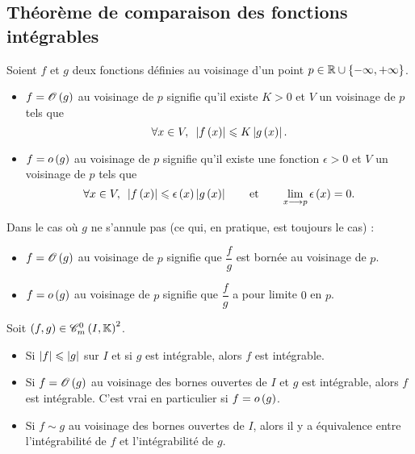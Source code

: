 \subsection{Théorème de comparaison des fonctions intégrables}

\begin{rappel}
Soient \(f\) et \(g\) deux fonctions définies au voisinage d'un point \(p\in\mathbb{R}\cup\left\lbrace-\infty,+\infty\right\rbrace\).

\begin{itemize}
    \item \(f=\mathscr{O}\left(g\right)\) au voisinage de \(p\) signifie qu'il existe \(K>0\) et \(V\) un voisinage de \(p\) tels que \[\quantifs{\forall x\in V}\abs{f\paren{x}}\leq K\abs{g\paren{x}}.\]
    \item \(f=o\left(g\right)\) au voisinage de \(p\) signifie qu'il existe une fonction \(\epsilon>0\) et \(V\) un voisinage de \(p\) tels que \[\quantifs{\forall x\in V}\abs{f\paren{x}}\leq\epsilon\paren{x}\abs{g\paren{x}}\qquad\text{et}\qquad\lim_{x\to p}\epsilon\paren{x}=0.\]
\end{itemize}

Dans le cas où \(g\) ne s'annule pas (ce qui, en pratique, est toujours le cas) :

\begin{itemize}
    \item \(f=\mathscr{O}\left(g\right)\) au voisinage de \(p\) signifie que \(\dfrac{f}{g}\) est bornée au voisinage de \(p\). \\
    \item \(f=o\left(g\right)\) au voisinage de \(p\) signifie que \(\dfrac{f}{g}\) a pour limite \(0\) en \(p\).
\end{itemize}
\end{rappel}

\begin{theo}
Soit \(\paren{f,g}\in\contm[I]^2\).

\begin{itemize}
    \item Si \(\left\lvert f\right\rvert\leqslant\left\lvert g\right\rvert\) sur \(I\) et si \(g\) est intégrable, alors \(f\) est intégrable. \\
    \item Si \(f=\mathscr{O}\left(g\right)\) au voisinage des bornes ouvertes de \(I\) et \(g\) est intégrable, alors \(f\) est intégrable. C'est vrai en particulier si \(f=o\left(g\right)\). \\
    \item Si \(f\sim g\) au voisinage des bornes ouvertes de \(I\), alors il y a équivalence entre l'intégrabilité de \(f\) et l'intégrabilité de \(g\).
\end{itemize}
\end{theo}

